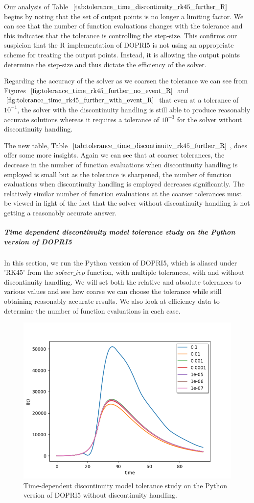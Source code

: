 Our analysis of Table $\ref{tab:tolerance_time_discontinuity_rk45_further_R}$ begins by noting that the set of output points is no longer a limiting factor. We can see that the number of function evaluations changes with the tolerance and this indicates that the tolerance is controlling the step-size. This confirms our suspicion that the R implementation of DOPRI5 is not using an appropriate scheme for treating the output points. Instead, it is allowing the output points determine the step-size and thus dictate the efficiency of the solver.

Regarding the accuracy of the solver as we coarsen the tolerance we can see from Figures $\ref{fig:tolerance_time_rk45_further_no_event_R}$ and $\ref{fig:tolerance_time_rk45_further_with_event_R}$ that even at a tolerance of $10^{-1}$, the solver with the discontinuity handling is still able to produce reasonably accurate solutions whereas it requires a tolerance of $10^{-3}$ for the solver without discontinuity handling.

The new table, Table $\ref{tab:tolerance_time_discontinuity_rk45_further_R}$, does offer some more insights. Again we can see that at coarser tolerances, the decrease in the number of function evaluations when discontinuity handling is employed is small but as the tolerance is sharpened, the number of function evaluations when discontinuity handling is employed decreases significantly. The relatively similar number of function evaluations at the coarser tolerances must be viewed in light of the fact that the solver without discontinuity handling is not getting a reasonably accurate answer. 

\subparagraph{Time dependent discontinuity model tolerance study on the Python version of DOPRI5}
In this section, we run the Python version of DOPRI5, which is aliased under 'RK45' from the $solver\_ivp$ function, with multiple tolerances, with and without discontinuity handling. We will set both the relative and absolute tolerances to various values and see how coarse we can choose the tolerance while still obtaining reasonably accurate results. We also look at efficiency data to determine  the number of function evaluations in each case.

\begin{figure}[H]
\centering
\includegraphics[width=0.7\linewidth]{./figures/tolerance_time_rk45_no_event_py}
\caption{Time-dependent discontinuity model tolerance study on the Python version of DOPRI5 without discontinuity handling.}
\label{fig:tolerance_time_rk45_no_event_py}
\end{figure}


